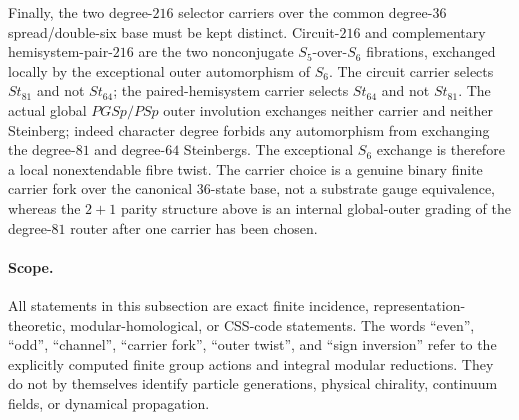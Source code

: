 Finally, the two degree-$216$ selector carriers over the common degree-$36$
spread/double-six base must be kept distinct.  Circuit-$216$ and complementary
hemisystem-pair-$216$ are the two nonconjugate $S_5$-over-$S_6$ fibrations,
exchanged locally by the exceptional outer automorphism of $S_6$.  The circuit
carrier selects $St_{81}$ and not $St_{64}$; the paired-hemisystem carrier
selects $St_{64}$ and not $St_{81}$.  The actual global $PGSp/PSp$ outer
involution exchanges neither carrier and neither Steinberg; indeed character
degree forbids any automorphism from exchanging the degree-$81$ and degree-$64$
Steinbergs.  The exceptional $S_6$ exchange is therefore a local nonextendable
fibre twist.  The carrier choice is a genuine binary finite carrier fork over
the canonical $36$-state base, not a substrate gauge equivalence, whereas the
$2+1$ parity structure above is an internal global-outer grading of the
degree-$81$ router after one carrier has been chosen.

\paragraph{Scope.}
All statements in this subsection are exact finite incidence,
representation-theoretic, modular-homological, or CSS-code statements.  The
words ``even'', ``odd'', ``channel'', ``carrier fork'', ``outer twist'', and
``sign inversion'' refer to the explicitly computed finite group actions and
integral modular reductions.  They do not by themselves identify particle
generations, physical chirality, continuum fields, or dynamical propagation.
